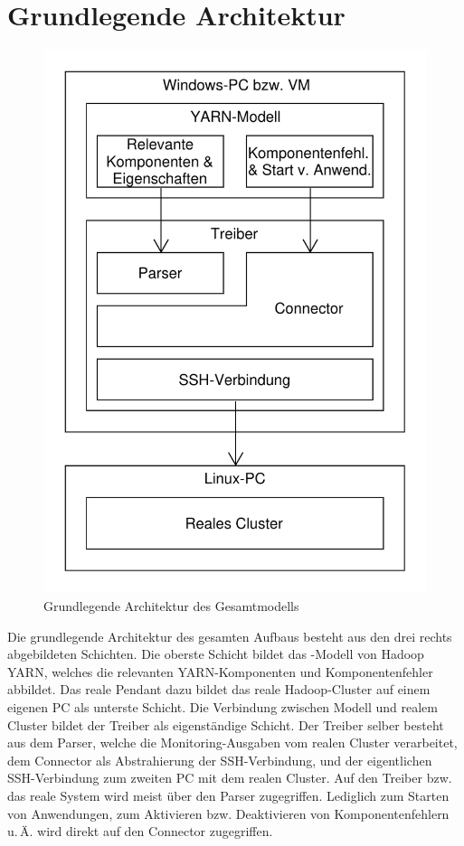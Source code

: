 \section{Grundlegende Architektur}\label{sec:architecture}

\begin{figure}
	\centering
	\includegraphics[width=0.5\columnwidth]{./images/modelArchitecture.pdf}
	\caption{Grundlegende Architektur des Gesamtmodells}
	\label{fig:modelArchitecture}
\end{figure}

Die grundlegende Architektur des gesamten Aufbaus besteht aus den drei rechts abgebildeten Schichten. Die oberste Schicht bildet das \sS-Modell von Hadoop YARN, welches die relevanten YARN-Komponenten und Komponentenfehler abbildet. Das reale Pendant dazu bildet das reale Hadoop-Cluster auf einem eigenen PC als unterste Schicht. Die Verbindung zwischen Modell und realem Cluster bildet der Treiber als eigenständige Schicht. Der Treiber selber besteht aus dem Parser, welche die Monitoring-Ausgaben vom realen Cluster verarbeitet, dem Connector als Abstrahierung der SSH-Verbindung, und der eigentlichen SSH-Verbindung zum zweiten PC mit dem realen Cluster. Auf den Treiber bzw. das reale System wird meist über den Parser zugegriffen. Lediglich zum Starten von Anwendungen, zum Aktivieren bzw. Deaktivieren von Komponentenfehlern u.\,Ä. wird direkt auf den Connector zugegriffen.